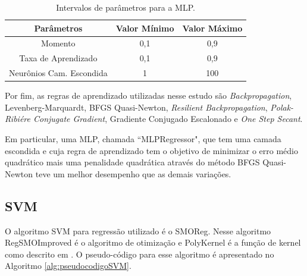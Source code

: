 \begin{table}[h]
\caption{Intervalos de parâmetros para a MLP.}\label{tab:mlp_configuration_investigation} \centering
\begin{tabular}{|c|c|c|}
  \hline
  Parâmetros & Valor Mínimo & Valor Máximo \\
  \hline
  Momento & 0,1 & 0,9 \\
  \hline
  Taxa de Aprendizado & 0,1 & 0,9 \\
  \hline
  Neurônios Cam. Escondida & 1 & 100 \\
  \hline
\end{tabular}
\end{table}

Por fim, as regras de aprendizado utilizadas nesse estudo são \textit{Backpropagation}, Levenberg-Marquardt, BFGS Quasi-Newton, \textit{Resilient Backpropagation}, \textit{Polak-Ribiére Conjugate Gradient}, Gradiente Conjugado Escalonado e \textit{One Step Secant}.

Em particular, uma MLP, chamada ``MLPRegressor", que tem uma camada escondida e cuja regra de aprendizado tem o objetivo de minimizar o erro médio quadrático mais uma penalidade quadrática através do método BFGS Quasi-Newton teve um melhor desempenho que as demais variações.

\subsection{SVM}

O algoritmo SVM para regressão utilizado é o SMOReg. Nesse algoritmo RegSMOImproved é o algoritmo de otimização e PolyKernel é a função de kernel como descrito em \cite{Shevade1999}. O pseudo-código para esse algoritmo é apresentado no Algoritmo \ref{alg:pseudocodigoSVM}.


